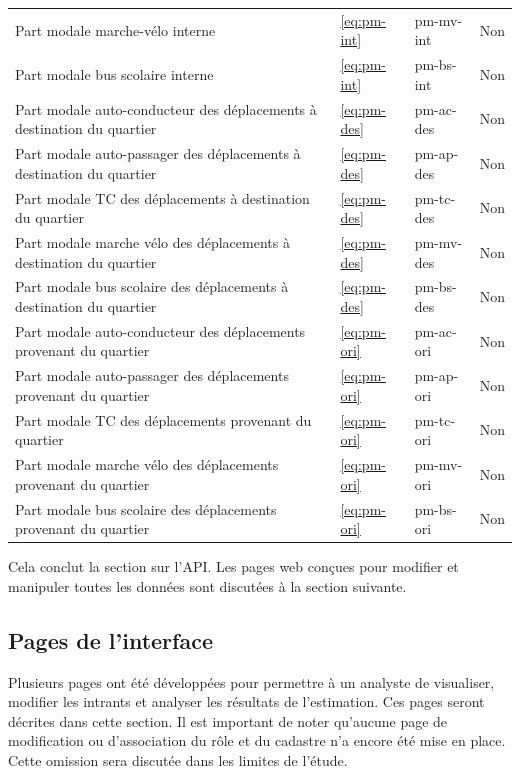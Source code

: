 {\begin{center}
\begin{longtable}{p{8cm}m{1.5cm}ll}
         Part modale marche-vélo interne & \ref{eq:pm-int}& pm-mv-int& Non\\
         Part modale bus scolaire interne & \ref{eq:pm-int}& pm-bs-int& Non\\
         Part modale auto-conducteur des déplacements à destination du quartier & \ref{eq:pm-des} & pm-ac-des& Non  \\
         Part modale auto-passager des déplacements à destination du quartier & \ref{eq:pm-des} & pm-ap-des & Non\\
         Part modale \ac{TC} des déplacements à destination du quartier & \ref{eq:pm-des} & pm-tc-des & Non\\
         Part modale marche vélo des déplacements à destination du quartier & \ref{eq:pm-des} & pm-mv-des& Non\\
         Part modale bus scolaire des déplacements à destination du quartier & \ref{eq:pm-des} & pm-bs-des& Non\\
         Part modale auto-conducteur des déplacements provenant du quartier & \ref{eq:pm-ori} & pm-ac-ori& Non  \\
         Part modale auto-passager des déplacements provenant du quartier & \ref{eq:pm-ori} & pm-ap-ori& Non \\
         Part modale \ac{TC} des déplacements provenant du quartier & \ref{eq:pm-ori} & pm-tc-ori & Non\\
         Part modale marche vélo des déplacements provenant du quartier & \ref{eq:pm-ori} & pm-mv-ori& Non\\
         Part modale bus scolaire des déplacements provenant du quartier & \ref{eq:pm-ori} & pm-bs-ori& Non\\
    \end{longtable}
\end{center}}
Cela conclut la section sur l'\ac{API}. Les pages web conçues pour modifier et manipuler toutes les données  sont discutées à la section suivante.
\subsection{Pages de l'interface}
Plusieurs pages ont été développées pour permettre à un analyste de visualiser, modifier les intrants et analyser les résultats de l'estimation. Ces pages seront décrites dans cette section. Il est important de noter qu'aucune page de modification ou d'association du rôle et du cadastre n'a encore été mise en place. Cette omission sera discutée dans les limites de l'étude.

